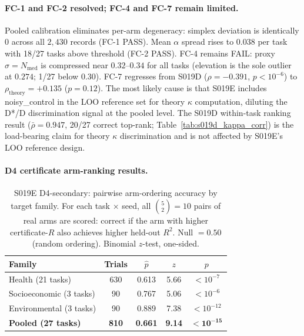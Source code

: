 \documentclass{article}
\begin{document}
\paragraph{FC-1 and FC-2 resolved; FC-4 and FC-7 remain limited.}
Pooled calibration eliminates per-arm degeneracy: simplex deviation is identically $0$ across all $2{,}430$ records (FC-1 PASS). Mean $\alpha$ spread rises to $0.038$ per task with 18/27 tasks above threshold (FC-2 PASS). FC-4 remains FAIL: proxy $\sigma = N_{\text{med}}$ is compressed near $0.32$--$0.34$ for all tasks (elevation is the sole outlier at $0.274$; 1/27 below $0.30$). FC-7 regresses from S019D ($\rho = -0.391$, $p < 10^{-6}$) to $\rho_{\text{theory}} = +0.135$ ($p = 0.12$). The most likely cause is that S019E includes noisy\_control in the LOO reference set for theory $\kappa$ computation, diluting the D*/D discrimination signal at the pooled level. The S019D within-task ranking result ($\bar\rho = 0.947$, 20/27 correct top-rank; Table~\ref{tab:s019d_kappa_corr}) is the load-bearing claim for theory $\kappa$ discrimination and is not affected by S019E's LOO reference design.

\paragraph{D4 certificate arm-ranking results.}

\begin{table}[htbp]
\centering
\small
\caption{S019E D4-secondary: pairwise arm-ordering accuracy by target family. For each task $\times$ seed, all $\binom{5}{2} = 10$ pairs of real arms are scored: correct if the arm with higher certificate-$R$ also achieves higher held-out $R^2$. Null $= 0.50$ (random ordering). Binomial $z$-test, one-sided.}
\label{tab:s019e_d4}
\begin{tabular}{l|ccc|c}
\toprule
\textbf{Family} & \textbf{Trials} & $\hat{p}$ & $z$ & $p$ \\
\midrule
Health (21 tasks)         & 630 & 0.613 & 5.66 & $< 10^{-7}$ \\
Socioeconomic (3 tasks)   & 90  & 0.767 & 5.06 & $< 10^{-6}$ \\
Environmental (3 tasks)   & 90  & 0.889 & 7.38 & $< 10^{-12}$ \\
\midrule
\textbf{Pooled (27 tasks)} & \textbf{810} & \textbf{0.661} & \textbf{9.14} & $\bm{< 10^{-15}}$ \\
\bottomrule
\end{tabular}
\end{table}
\end{document}
